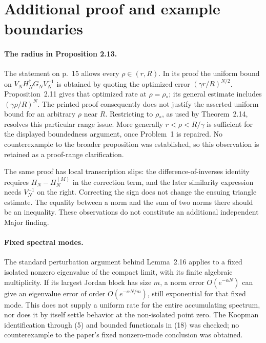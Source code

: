 \documentclass[10pt]{article}
\begin{document}
\section*{Additional proof and example boundaries}
\paragraph*{The radius in Proposition 2.13.}\mbox{}\par
The statement on p. 15 allows every \(\rho\in(r,R)\). In its proof the uniform bound on \(V_NH_N^\dagger G_NV_N^{-1}\) is obtained by quoting the optimized error \((\gamma r/R)^{N/2}\). Proposition 2.11 gives that optimized rate at \(\rho=\rho_*\); its general estimate includes \((\gamma\rho/R)^N\). The printed proof consequently does not justify the asserted uniform bound for an arbitrary \(\rho\) near \(R\). Restricting to \(\rho_*\), as used by Theorem 2.14, resolves this particular range issue. More generally \(r<\rho<R/\gamma\) is sufficient for the displayed boundedness argument, once Problem 1 is repaired. No counterexample to the broader proposition was established, so this observation is retained as a proof-range clarification.\par
The same proof has local transcription slips: the difference-of-inverses identity requires \(H_N-H_N^{(M)}\) in the correction term, and the later similarity expression needs \(V_N^{-1}\) on the right. Correcting the sign does not change the ensuing triangle estimate. The equality between a norm and the sum of two norms there should be an inequality. These observations do not constitute an additional independent Major finding.\par
\paragraph*{Fixed spectral modes.}\mbox{}\par
The standard perturbation argument behind Lemma 2.16 applies to a fixed isolated nonzero eigenvalue of the compact limit, with its finite algebraic multiplicity. If its largest Jordan block has size \(m\), a norm error \(O(e^{-\alpha N})\) can give an eigenvalue error of order \(O(e^{-\alpha N/m})\), still exponential for that fixed mode. This does not supply a uniform rate for the entire accumulating spectrum, nor does it by itself settle behavior at the non-isolated point zero. The Koopman identification through (5) and bounded functionals in (18) was checked; no counterexample to the paper’s fixed nonzero-mode conclusion was obtained.\par
\end{document}
